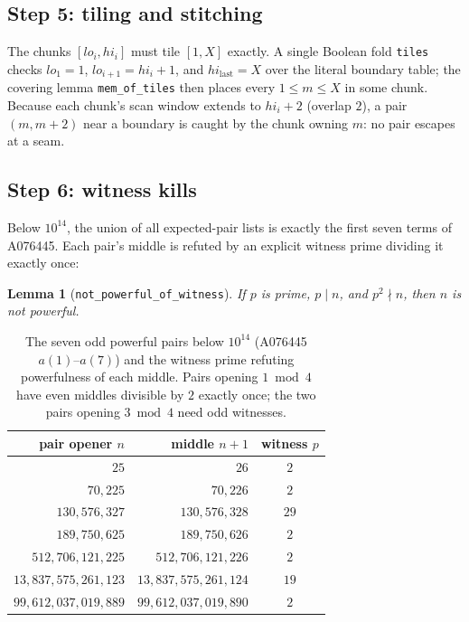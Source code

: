 \documentclass[11pt]{article}
\newtheorem{lemma}[theorem]{Lemma}
\theoremstyle{definition}
\theoremstyle{remark}
\newcommand{\code}[1]{\texttt{#1}}
\begin{document}
\subsection{Step 5: tiling and stitching}\label{sec:tiling}

The chunks $[lo_i, hi_i]$ must tile $[1, X]$ exactly. A single Boolean
fold \code{tiles} checks $lo_1 = 1$, $lo_{i+1} = hi_i + 1$, and
$hi_{\mathrm{last}} = X$ over the literal boundary table; the covering
lemma \code{mem\_of\_tiles} then places every $1 \le m \le X$ in some
chunk. Because each chunk's scan window extends to $hi_i + 2$ (overlap
$2$), a pair $(m, m{+}2)$ near a boundary is caught by the chunk owning
$m$: no pair escapes at a seam.

\subsection{Step 6: witness kills}\label{sec:witness}

Below $10^{14}$, the union of all expected-pair lists is exactly the
first seven terms of A076445. Each pair's middle is refuted by an
explicit witness prime dividing it exactly once:

\begin{lemma}[\code{not\_powerful\_of\_witness}]
If $p$ is prime, $p \mid n$, and $p^2 \nmid n$, then $n$ is not
powerful.
\end{lemma}

\begin{table}[h]
\centering
\begin{tabular}{r r c}
\toprule
pair opener $n$ & middle $n+1$ & witness $p$ \\
\midrule
$25$ & $26$ & $2$ \\
$70{,}225$ & $70{,}226$ & $2$ \\
$130{,}576{,}327$ & $130{,}576{,}328$ & $29$ \\
$189{,}750{,}625$ & $189{,}750{,}626$ & $2$ \\
$512{,}706{,}121{,}225$ & $512{,}706{,}121{,}226$ & $2$ \\
$13{,}837{,}575{,}261{,}123$ & $13{,}837{,}575{,}261{,}124$ & $19$ \\
$99{,}612{,}037{,}019{,}889$ & $99{,}612{,}037{,}019{,}890$ & $2$ \\
\bottomrule
\end{tabular}
\caption{The seven odd powerful pairs below $10^{14}$ (A076445
$a(1)$--$a(7)$) and the witness prime refuting powerfulness of each
middle. Pairs opening $1 \bmod 4$ have even middles divisible by $2$
exactly once; the two pairs opening $3 \bmod 4$ need odd witnesses.}
\label{tab:witnesses}
\end{table}
\end{document}
